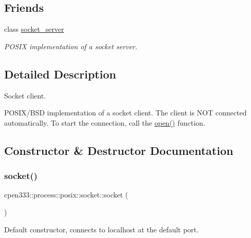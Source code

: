 \subsection*{Friends}
\begin{DoxyCompactItemize}
\item 
class \hyperlink{classcpen333_1_1process_1_1posix_1_1socket_aba37c0ea463da9263b0712d3b3389066}{socket\+\_\+server}
\begin{DoxyCompactList}\small\item\em P\+O\+S\+IX implementation of a socket server. \end{DoxyCompactList}\end{DoxyCompactItemize}


\subsection{Detailed Description}
Socket client. 

P\+O\+S\+I\+X/\+B\+SD implementation of a socket client. The client is N\+OT connected automatically. To start the connection, call the \hyperlink{classcpen333_1_1process_1_1posix_1_1socket_a0ac2e0452989cca9e6279602a8d73854}{open()} function. 

\subsection{Constructor \& Destructor Documentation}
\mbox{\label{classcpen333_1_1process_1_1posix_1_1socket_a37b973439d588e1a3b3f43381e9fef55}} 
\subsubsection{\texorpdfstring{socket()}{socket()}\hspace{0.1cm}{\footnotesize\ttfamily [1/3]}}
{\footnotesize\ttfamily cpen333\+::process\+::posix\+::socket\+::socket (\begin{DoxyParamCaption}{ }\end{DoxyParamCaption})\hspace{0.3cm}{\ttfamily [inline]}}



Default constructor, connects to localhost at the default port. 

